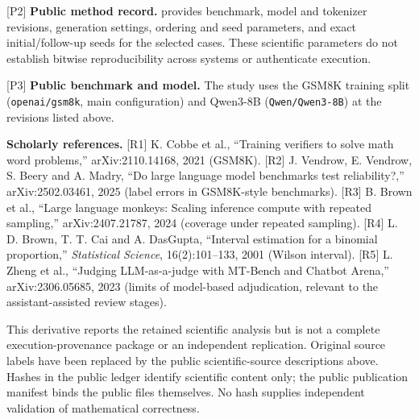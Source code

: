 \documentclass[11pt,a4paper]{article}
\DeclareRobustCommand{\longtok}[1]{\texttt{\seqsplit{#1}}}
\begin{document}
{[}P2{]} \textbf{Public method record.}
\longtok{scientific\_method\_public.json} provides benchmark, model and
tokenizer revisions, generation settings, ordering and seed parameters,
and exact initial/follow-up seeds for the selected cases. These
scientific parameters do not establish bitwise reproducibility across
systems or authenticate execution.

{[}P3{]} \textbf{Public benchmark and model.} The study uses the GSM8K
training split (\texttt{openai/gsm8k}, main configuration) and Qwen3-8B
(\texttt{Qwen/Qwen3-8B}) at the revisions listed above.

\textbf{Scholarly references.} {[}R1{]} K. Cobbe et al., ``Training
verifiers to solve math word problems,'' arXiv:2110.14168, 2021 (GSM8K).
{[}R2{]} J. Vendrow, E. Vendrow, S. Beery and A. Madry, ``Do large
language model benchmarks test reliability?,'' arXiv:2502.03461, 2025
(label errors in GSM8K-style benchmarks). {[}R3{]} B. Brown et al.,
``Large language monkeys: Scaling inference compute with repeated
sampling,'' arXiv:2407.21787, 2024 (coverage under repeated sampling).
{[}R4{]} L. D. Brown, T. T. Cai and A. DasGupta, ``Interval estimation
for a binomial proportion,'' \emph{Statistical Science}, 16(2):101--133,
2001 (Wilson interval). {[}R5{]} L. Zheng et al., ``Judging
LLM-as-a-judge with MT-Bench and Chatbot Arena,'' arXiv:2306.05685, 2023
(limits of model-based adjudication, relevant to the assistant-assisted
review stages).

This derivative reports the retained scientific analysis but is not a
complete execution-provenance package or an independent replication.
Original source labels have been replaced by the public
scientific-source descriptions above. Hashes in the public ledger
identify scientific content only; the public publication manifest binds
the public files themselves. No hash supplies independent validation of
mathematical correctness.
\end{document}
